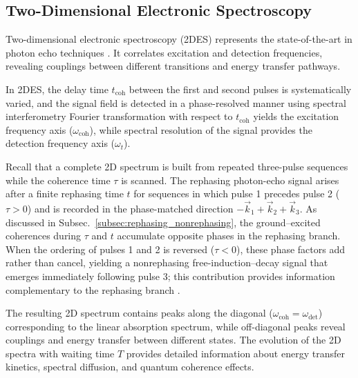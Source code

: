 \subsection{Two-Dimensional Electronic Spectroscopy}
\label{subsec:2d_spectroscopy}

\noindent Two-dimensional electronic spectroscopy (2DES) represents the state-of-the-art in photon echo techniques \cite{jonas2003twodimensionalfemtosecondspectroscopy, brixneretal2004phasestabilizedtwodimensionalelectronic, schlau-cohenetal2011twodimensionalelectronicspectroscopy}. It correlates excitation and detection frequencies, revealing couplings between different transitions and energy transfer pathways.

\noindent In 2DES, the delay time $t_{\text{coh}}$ between the first and second pulses is systematically varied, and the signal field is detected in a phase-resolved manner using spectral interferometry %
Fourier transformation with respect to $t_{\text{coh}}$ yields the excitation frequency axis ($\omega_{\text{coh}}$), while spectral resolution of the signal provides the detection frequency axis ($\omega_t$).

\noindent Recall that a complete 2D spectrum is built from repeated three-pulse sequences while the coherence time $\tau$ is scanned. The rephasing photon-echo signal arises after a finite rephasing time $t$ for sequences in which pulse 1 precedes pulse 2 ($\tau>0$) and is recorded in the phase-matched direction $-\vec{k}_1 + \vec{k}_2 + \vec{k}_3$. As discussed in Subsec.~\ref{subsec:rephasing_nonrephasing}, the ground–excited coherences during $\tau$ and $t$ accumulate opposite phases in the rephasing branch. When the ordering of pulses 1 and 2 is reversed ($\tau<0$), these phase factors add rather than cancel, yielding a nonrephasing free-induction–decay signal that emerges immediately following pulse 3; this contribution provides information complementary to the rephasing branch \cite{ginsbergetal2009twodimensionalelectronicspectroscopy}.

\noindent The resulting 2D spectrum contains peaks along the diagonal ($\omega_{\text{coh}} = \omega_{\text{det}}$) corresponding to the linear absorption spectrum, while off-diagonal peaks reveal couplings and energy transfer between different states. The evolution of the 2D spectra with waiting time $T$ provides detailed information about energy transfer kinetics, spectral diffusion, and quantum coherence effects.

